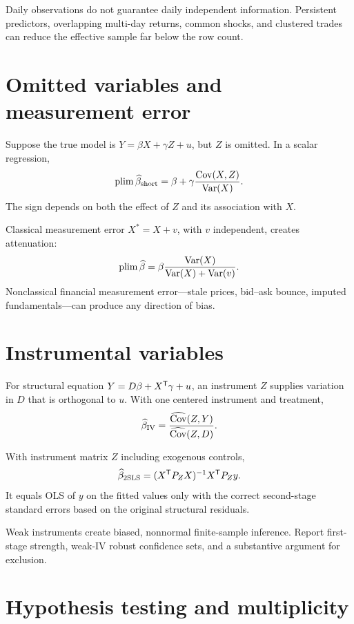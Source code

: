 \begin{warning}
Daily observations do not guarantee daily independent information. Persistent
predictors, overlapping multi-day returns, common shocks, and clustered trades can
reduce the effective sample far below the row count.
\end{warning}

\section{Omitted variables and measurement error}

Suppose the true model is $Y=\beta X+\gamma Z+u$, but $Z$ is omitted. In a scalar
regression,
\[
\operatorname{plim}\widehat\beta_{\mathrm{short}}
=\beta+\gamma\frac{\operatorname{Cov}(X,Z)}{\operatorname{Var}(X)}.
\]
The sign depends on both the effect of $Z$ and its association with $X$.

Classical measurement error $X^\ast=X+v$, with $v$ independent, creates attenuation:
\[
\operatorname{plim}\widehat\beta
=\beta\frac{\operatorname{Var}(X)}{\operatorname{Var}(X)+\operatorname{Var}(v)}.
\]
Nonclassical financial measurement error---stale prices, bid--ask bounce, imputed
fundamentals---can produce any direction of bias.

\section{Instrumental variables}

For structural equation $Y=D\beta+X^\mathsf T\gamma+u$, an instrument $Z$ supplies
variation in $D$ that is orthogonal to $u$. With one centered instrument and
treatment,
\[
\widehat\beta_{\mathrm{IV}}=\frac{\widehat{\operatorname{Cov}}(Z,Y)}
{\widehat{\operatorname{Cov}}(Z,D)}.
\]

\begin{proposition}
With instrument matrix $Z$ including exogenous controls,
\[
\widehat\beta_{\mathrm{2SLS}}
=(X^\mathsf T P_ZX)^{-1}X^\mathsf T P_Zy.
\]
It equals OLS of $y$ on the fitted values only with the correct second-stage
standard errors based on the original structural residuals.
\end{proposition}

Weak instruments create biased, nonnormal finite-sample inference. Report first-stage
strength, weak-IV robust confidence sets, and a substantive argument for exclusion.

\section{Hypothesis testing and multiplicity}


